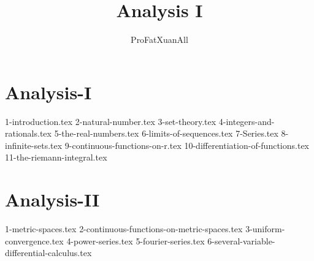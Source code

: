 \documentclass[11pt,a4paper]{book}
\theoremstyle{definition}
\theoremstyle{remark}
\begin{document}

\frontmatter

\title{Analysis I}
\author{ProFatXuanAll}
\maketitle

\tableofcontents




\mainmatter

\part{Analysis-I}

{1-introduction.tex}
{2-natural-number.tex}
{3-set-theory.tex}
{4-integers-and-rationals.tex}
{5-the-real-numbers.tex}
{6-limits-of-sequences.tex}
{7-Series.tex}
{8-infinite-sets.tex}
{9-continuous-functions-on-r.tex}
{10-differentiation-of-functions.tex}
{11-the-riemann-integral.tex}

\part{Analysis-II}

{1-metric-spaces.tex}
{2-continuous-functions-on-metric-spaces.tex}
{3-uniform-convergence.tex}
{4-power-series.tex}
{5-fourier-series.tex}
{6-several-variable-differential-calculus.tex}


\backmatter
\end{document}
